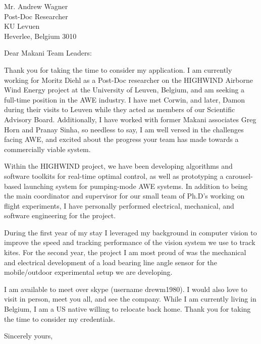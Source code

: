 \documentclass[11pt]{letter} %
\begin{document}
\signature{Andrew Wagner}                  %
\longindentation=0pt                       %
\let\raggedleft\raggedright                %
 
\begin{letter}{Mr. Andrew Wagner \\
Post-Doc Researcher \\
KU Levuen \\
Heverlee, Belgium 3010} 

\vfill %

\opening{Dear Makani Team Leaders:} 
 
\noindent Thank you for taking the time to consider my application.  I am
currently working for Moritz Diehl as a Post-Doc researcher on the HIGHWIND
Airborne Wind Energy project at the University of Leuven, Belgium, and am
seeking a full-time position in the AWE industry. I have met Corwin, and later,
Damon during their visits to Leuven while they acted as members of our
Scientific Advisory Board. Additionally, I have worked with former Makani
associates Greg Horn and Pranay Sinha, so needless to say, I am well versed in
the challenges facing AWE, and excited about the progress your team has made
towards a commercially viable system.  

\noindent Within the HIGHWIND project, we have been developing algorithms and
software toolkits for real-time optimal control, as well as prototyping a
carousel-based launching system for pumping-mode AWE systems.  In addition to
being the main coordinator and supervisor for our small team of Ph.D's working
on flight experiments, I have personally performed electrical, mechanical, and
software engineering for the project.  

During the first year of my stay I 
leveraged my background in computer vision to improve the speed and tracking
performance of the vision system we use to track kites.  For the second year,
the project I am most proud of was the mechanical and electrical development of
a load bearing line angle sensor for the mobile/outdoor experimental setup we
are developing.  

\noindent I am available to meet over skype (username drewm1980).  I would also
love to visit in person, meet you all, and see the company.  While I am
currently living in Belgium, I am a US native willing to relocate back home.
Thank you for taking the time to consider my credentials.
 
\closing{Sincerely yours,}
 
\encl{}

\end{letter}
 
\end{document}
